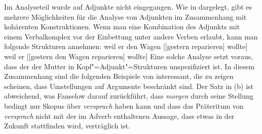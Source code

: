 {Im 
Analyseteil wurde auf Adjunkte nicht eingegangen. Wie in  dargelegt, gibt es
mehrere Möglichkeiten für die Analyse von Adjunkten im Zusammenhang mit kohärenten
Konstruktionen. Wenn man eine Kombination des Adjunkts mit einem Verbalkomplex vor der Einbettung
unter andere Verben erlaubt, kann man folgende Strukturen annehmen:
\eal
\label{anal-adjunct-VP-Einbettung}
\ex weil er den Wagen [[gestern reparieren] wollte]
\ex weil er [[gestern den Wagen reparieren] wollte]
\zl
Eine solche Analyse setzt voraus, dass der \lexw der Mutter in Kopf"=Adjunkt"=Strukturen
unspezifiziert ist. In diesem Zusammenhang sind die folgenden Beispiele von \citet[]{Fanselow2001a} interessant, die zu zeigen scheinen, dass Umstellungen auf Argumente beschränkt
sind.
\eal
{}
\label{bsp-adjunkte-in-kohaerenten-konstr}
\zl
Der Satz in (b) ist abweichend, was Fanselow darauf zurückführt, dass \emph{morgen}
durch seine Stellung bedingt nur Skopus über \emph{versprach} haben kann und dass das
Präteritum von \emph{versprach} nicht mit der im Adverb enthaltenen Aussage, dass etwas in
der Zukunft stattfinden wird, verträglich ist.

}
